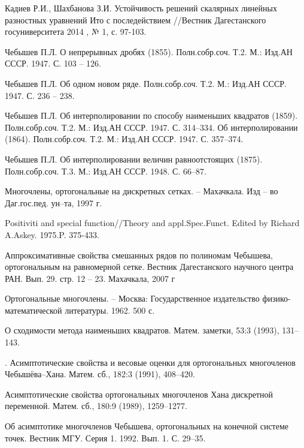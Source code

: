 \begin{thebibliography}{1}
Кадиев Р.И., Шахбанова З.И. Устойчивость решений скалярных линейных разностных уравнений Ито с последействием //Вестник Дагестанского госуниверситета 2014 , № 1, с. 97-103.


{Чебышев П.Л.} О непрерывных дробях (1855). Полн.собр.соч.
     Т.2. М.: Изд.АН СССР. 1947. С. 103 -- 126.

{Чебышев П.Л.} Об одном новом ряде.   Полн.собр.соч.
Т.2.  М.: Изд.АН
         СССР. 1947.  С. 236 -- 238.

{Чебышев П.Л.} Об интерполировании по способу наименьших квадратов (1859). Полн.собр.соч.  Т.2.  М.: Изд.АН СССР. 1947.  С. 314--334.
 Об интерполировании (1864). Полн.собр.соч.  Т.2.  М.: Изд.АН СССР. 1947.  С. 357--374.

{Чебышев П.Л.} Об интерполировании величин  равноотстоящих (1875).   Полн.собр.соч.  Т.3.  М.: Изд.АН  СССР. 1948.  С.
66--87.

 Многочлены, ортогональные на
дискретных      сетках. -- Махачкала. Изд -- во Даг.гос.пед.
ун--та, 1997 г.


 Positiviti and special function//Theory and
appl.Spec.Funct. Edited by Richard A.Askey. 1975.P. 375-433.

 Аппроксимативные свойства смешанных рядов по полиномам Чебышева, ортогональным на равномерной сетке.
Вестник Дагестанского научного центра РАН.  Вып. 29. стр. 12 -- 23. Махачкала, 2007 г

 Ортогональные многочлены. -- Москва: Государственное издательство физико-математической литературы. 1962. 500 с.

 О сходимости метода наименьших квадратов. Матем. заметки, 53:3 (1993),  131–143.

. Асимптотические свойства и весовые оценки для ортогональных многочленов Чебышёва–Хана. Матем. сб., 182:3 (1991),  408–420.

 Асимптотические свойства ортогональных многочленов Хана дискретной переменной. Матем. сб., 180:9 (1989),  1259–1277.

 Об асимптотике многочленов Чебышева, ортогональных на конечной системе точек. Вестник МГУ. Серия 1. 1992. Вып. 1. С. 29–35.






\end{thebibliography}
